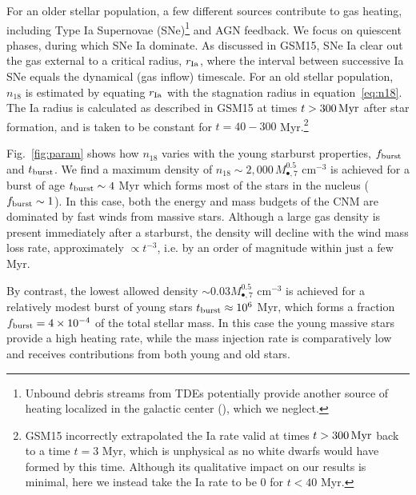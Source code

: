 \documentclass[usenatbib,fleqn]{mnras}
\newcommand{\Mbh}[1][]{M_{\bullet#1}}
\begin{document}
For an older stellar population, a few different sources contribute to
gas heating, including Type Ia Supernovae (SNe)\footnote{Unbound
  debris streams from TDEs potentially provide another source of
  heating localized in the galactic center
  (\citealt{Guillochon+2015a}), which we neglect.} and AGN feedback.
We focus on quiescent phases, during which SNe Ia dominate.  As
discussed in GSM15, SNe Ia clear out the gas external to a critical
radius, $r_{\rm Ia}$, where the interval between successive Ia SNe
equals the dynamical (gas inflow) timescale.  For an old stellar
population, $n_{18}$ is estimated by equating $r_{\rm Ia}$ with the
stagnation radius in equation~\eqref{eq:n18}.  The Ia radius is
calculated as described in GSM15 at times $t>300 \,{\rm Myr}$ after
star formation, and is taken to be constant for $t = 40-300$
Myr.\footnote{GSM15 incorrectly extrapolated the Ia rate valid at
  times $t>300 \,{\rm Myr}$ back to a time $t = 3$ Myr, which is
  unphysical as no white dwarfs would have formed by this time.
  Although its qualitative impact on our results is minimal, here we
  instead take the Ia rate to be 0 for $ t < 40$ Myr.}


Fig.~\ref{fig:param} shows how $n_{18}$ varies with the young
starburst properties, $f_{\rm burst}$ and $t_{\rm burst}$.  We find a
maximum density of $n_{18} \sim 2,000\, \Mbh[,7]^{0.5}$ cm$^{-3}$ is
achieved for a burst of age $t_{\rm burst} \sim 4$ Myr which forms
most of the stars in the nucleus ($f_{\rm burst} \sim 1$).  In this
case, both the energy and mass budgets of the CNM are dominated by
fast winds from massive stars.  Although a large gas density is
present immediately after a starburst, the density will decline with
the wind mass loss rate, approximately $\propto t^{-3}$, i.e. by an
order of magnitude within just a few Myr.

By contrast, the lowest allowed density $\sim 0.03 \Mbh[,7]^{0.5}$
cm$^{-3}$ is achieved for a relatively modest burst of young stars
$t_{\rm burst} \approx 10^{6}$ Myr, which forms a fraction $f_{\rm
  burst} = 4\times 10^{-4}$ of the total stellar mass. In this case
the young massive stars provide a high heating rate, while the mass
injection rate is comparatively low and receives contributions from
both young and old stars.
\end{document}
